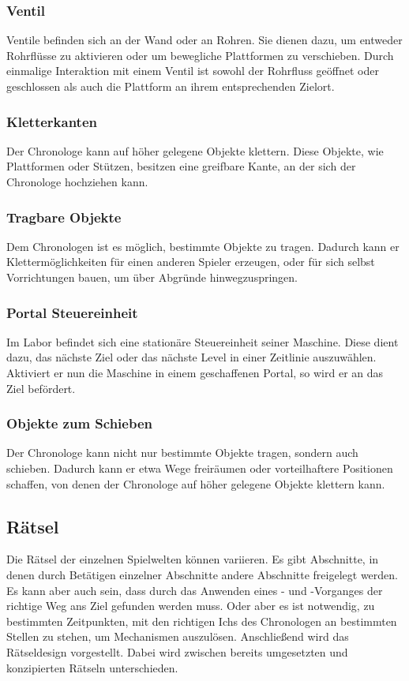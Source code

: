 \subsubsection{Ventil}\label{sec:ventil}
Ventile befinden sich an der Wand oder an Rohren. Sie dienen dazu, um entweder Rohrflüsse zu aktivieren oder um bewegliche Plattformen zu verschieben. Durch einmalige Interaktion mit einem Ventil ist sowohl der Rohrfluss geöffnet oder geschlossen als auch die Plattform an ihrem entsprechenden Zielort.

\subsubsection{Kletterkanten}
Der Chronologe kann auf höher gelegene Objekte klettern. Diese Objekte, wie  Plattformen oder Stützen, besitzen eine greifbare Kante, an der sich der Chronologe hochziehen kann. 

\subsubsection{Tragbare Objekte}
Dem Chronologen ist es möglich, bestimmte Objekte zu tragen. Dadurch kann er Klettermöglichkeiten für einen anderen Spieler erzeugen, oder für sich selbst Vorrichtungen bauen, um über Abgründe hinwegzuspringen.

\subsubsection{Portal Steuereinheit}
Im Labor befindet sich eine stationäre Steuereinheit seiner Maschine. Diese dient dazu, das nächste Ziel oder das nächste Level in einer Zeitlinie auszuwählen. Aktiviert er nun die Maschine in einem geschaffenen Portal, so wird er an das Ziel befördert.

\subsubsection{Objekte zum Schieben}
Der Chronologe kann nicht nur bestimmte Objekte tragen, sondern auch schieben. Dadurch kann er etwa Wege freiräumen oder vorteilhaftere Positionen schaffen, von denen der Chronologe auf höher gelegene Objekte klettern kann.

\subsection{Rätsel}
Die Rätsel der einzelnen Spielwelten können variieren. Es gibt Abschnitte, in denen durch Betätigen einzelner Abschnitte andere Abschnitte freigelegt werden. Es kann aber auch sein, dass durch das Anwenden eines - und -Vorganges der richtige Weg ans Ziel gefunden werden muss. Oder aber es ist notwendig, zu bestimmten Zeitpunkten, mit den richtigen Ichs des Chronologen an bestimmten Stellen zu stehen, um Mechanismen auszulösen. Anschließend wird das Rätseldesign vorgestellt. Dabei wird zwischen bereits umgesetzten und konzipierten Rätseln unterschieden.

